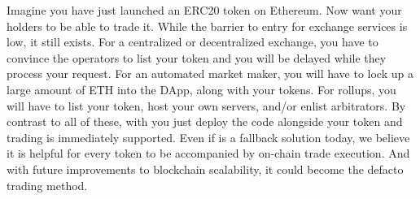 Imagine you have just launched an ERC20 token on Ethereum. Now want your holders to be able to trade it. While the barrier to entry for exchange services is low, it still exists. For a centralized or decentralized exchange, you have to convince the operators to list your token and you will be delayed while they process your request. For an automated market maker, you will have to lock up a large amount of ETH into the DApp, along with your tokens. For rollups, you will have to list your token, host your own servers, and/or enlist arbitrators. By contrast to all of these, with \cm you just deploy the code alongside your token and trading is immediately supported. Even if \cm is a fallback solution today, we believe it is helpful for every token to be accompanied by on-chain trade execution. And with future improvements to blockchain scalability, it could become the defacto trading method.
 































